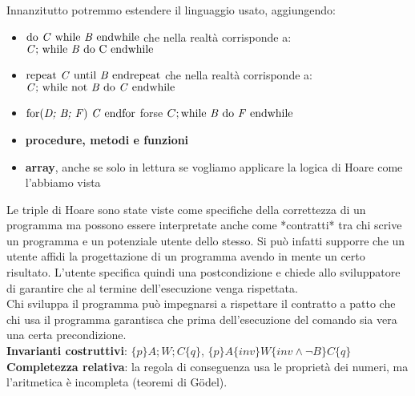 Innanzitutto potremmo estendere il linguaggio usato, aggiungendo: 
\begin{itemize} 
    \item $\mbox{do \textit{C} while \textit{B} endwhile}$ che nella realtà corrisponde a: $\mbox{\textit{C}; while \textit{B} do \textnormal{C} endwhile}$ 
    \item $\mbox{repeat \textit{C} until \textit{B} endrepeat}$ che nella realtà corrisponde a: $\mbox{\textit{C}; while not \textit{B} do \textit{C} endwhile}$ 
    \item  $\mbox{for(\textit{D; B; F}) \textit{C} endfor} $   forse $C;\mbox{while \textit{B} do \textit{F}  endwhile}$ 
    \item \textbf{procedure, metodi e funzioni}
    \item \textbf{array}, anche se solo in lettura se vogliamo applicare la logica di Hoare come l'abbiamo vista 
\end{itemize}

Le triple di Hoare sono state viste come specifiche della correttezza di un programma ma possono essere interpretate anche come *contratti* tra chi scrive un programma e un potenziale utente dello stesso.
Si può infatti supporre che un utente affidi la progettazione di un programma avendo in mente un certo risultato. 
L’utente specifica quindi una postcondizione e chiede allo sviluppatore di garantire che al termine dell’esecuzione venga rispettata. \\
Chi sviluppa il programma può impegnarsi a rispettare il contratto a patto che chi usa il programma garantisca che prima dell’esecuzione del comando sia vera una certa precondizione.\\
\textbf{Invarianti costruttivi}: $\{p\}  A; W; C  \{q\}$, $\{p\}  A  \{inv\}  W  \{inv \land \neg B\}  C  \{q\}$ \\
\textbf{Completezza relativa}: la regola di conseguenza usa le proprietà dei numeri, ma l’aritmetica è incompleta (teoremi di Gödel).